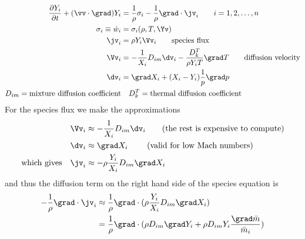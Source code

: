 \documentclass{article}
\begin{document}
\begin{align*}
  {\partial Y_i \over \partial t} + (\vv\cdot\grad) Y_i & = {1\over\rho}\sigma_i
              - {1\over\rho}\grad\cdot \jv_i \qquad i=1,2,\ldots,n \\
   \sigma_i \equiv \dot{w}_i &= \sigma_i(\rho,T,\Yv)   \\
      \jv_i & = \rho Y_i \Vv_i \qquad\mbox{species flux} \\
      \Vv_i &= - {1\over X_i} D_{im} \dv_i - {D_k^T\over \rho Y_i T} \grad T \qquad\mbox{diffusion velocity} \\
      \dv_i &= \grad X_i + (X_i-Y_i) {1\over p} \grad p    \\
      D_{im} = \mbox{mixture diffusion coefficient} & \quad D_k^T = \mbox{thermal diffusion coefficient}
\end{align*}
For the species flux we make the approximations
\begin{align*}
  \Vv_i & \approx - {1\over X_i} D_{im} \dv_i  \qquad \mbox{(the rest is expensive to compute)} \\
  \dv_i & \approx \grad X_i        \qquad \mbox{ (valid for low Mach numbers)}           \\
  \mbox{which gives}\quad \jv_i & \approx - \rho {Y_i \over X_i} D_{im}\grad X_i
\end{align*}
and thus the diffusion term on the right hand side of the species equation is
\begin{align*}
-{1\over\rho}\grad\cdot \jv_i &\approx  {1\over\rho}\grad\cdot(\rho {Y_i \over X_i} D_{im}\grad X_i) \\
          &= {1\over\rho}\grad\cdot( \rho D_{im}\grad Y_i + \rho D_{im} Y_i {\grad \mbar \over \mbar_i} )
\end{align*}
\end{document}
